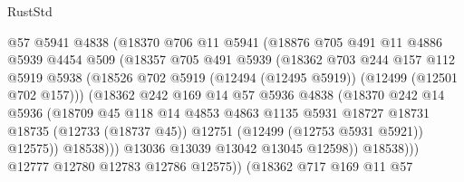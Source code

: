 \begin{lexlean}{RustStd}
\begin{coremodule}
                      @57
                      @5941
                      @4838
                      (@18370
                        @706
                        @11
                        @5941
                        (@18876
                          @705
                          @491
                          @11
                          @4886
                          @5939
                          @4454
                          @509
                          (@18357
                            @705
                            @491
                            @5939
                            (@18362
                              @703
                              @244
                              @157
                              @112
                              @5919
                              @5938
                              (@18526
                                @702
                                @5919
                                (@12494 (@12495 @5919))
                                (@12499 (@12501 @702 @157)))
                              (@18362
                                @242
                                @169
                                @14
                                @57
                                @5936
                                @4838
                                (@18370
                                  @242
                                  @14
                                  @5936
                                  (@18709
                                    @45
                                    @118
                                    @14
                                    @4853
                                    @4863
                                    @1135
                                    @5931
                                    @18727
                                    @18731
                                    @18735
                                    (@12733 (@18737 @45))
                                    @12751
                                    (@12499 (@12753 @5931 @5921))
                                    @12575))
                                @18538)))
                          @13036
                          @13039
                          @13042
                          @13045
                          @12598))
                      @18538)))
                @12777
                @12780
                @12783
                @12786
                @12575))
            (@18362
              @717
              @169
              @11
              @57

\end{coremodule}
\end{lexlean}
